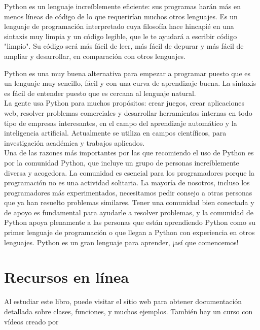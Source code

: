 Python es un lenguaje increíblemente eficiente: sus programas harán más en menos líneas de código de lo que requerirían muchos otros lenguajes. Es un lenguaje de programación interpretado cuya filosofía hace hincapié en una sintaxis muy limpia y un código legible, que le te ayudará a escribir código "limpio". Su código será más fácil de leer, más fácil de depurar y más fácil de ampliar y desarrollar, en comparación con otros lenguajes. 

Python es una muy buena alternativa para empezar a programar puesto que es un lenguaje muy sencillo, fácil y con una curva de aprendizaje buena. La sintaxis es fácil de entender puesto que es cercana al lenguaje natural.\\

La gente usa Python para muchos propósitos: crear juegos, crear aplicaciones web, resolver problemas comerciales y desarrollar herramientas internas en todo tipo de empresas interesantes, en el campo del aprendizaje automático y la inteligencia artificial. Actualmente se utiliza en campos científicos, para investigación académica y trabajos aplicados.\\

Una de las razones más importantes por las que recomiendo el uso de Python es por la comunidad Python, que incluye un grupo de personas increíblemente diversa y acogedora. La comunidad es esencial para los programadores porque la programación no es una actividad solitaria. La mayoría de nosotros, incluso los programadores más experimentados, necesitamos pedir consejo a otras personas que ya han resuelto problemas similares. Tener una comunidad bien conectada y de apoyo es fundamental para ayudarle a resolver problemas, y la comunidad de Python apoya plenamente a las personas que están aprendiendo Python como su primer lenguaje de programación o que llegan a Python con experiencia en otros lenguajes. Python es un gran lenguaje para aprender, ¡así que comencemos!






\section*{Recursos en línea}

Al estudiar este libro, puede visitar el sitio web   para obtener documentación detallada sobre  clases, funciones, y muchos ejemplos. También hay un curso con  vídeos creado por 


